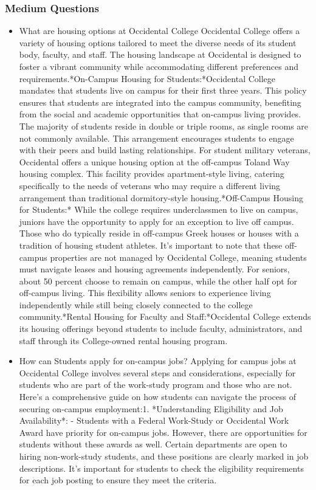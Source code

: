 \documentclass[10pt,twocolumn]{article}
\begin{document}
\subsubsection{Medium Questions}
\begin{itemize}
\item What are housing options at Occidental College
Occidental College offers a variety of housing options tailored to meet the diverse needs of its student body, faculty, and staff. The housing landscape at Occidental is designed to foster a vibrant community while accommodating different preferences and requirements.*On-Campus Housing for Students:*Occidental College mandates that students live on campus for their first three years. This policy ensures that students are integrated into the campus community, benefiting from the social and academic opportunities that on-campus living provides. The majority of students reside in double or triple rooms, as single rooms are not commonly available. This arrangement encourages students to engage with their peers and build lasting relationships.
For student military veterans, Occidental offers a unique housing option at the off-campus Toland Way housing complex. This facility provides apartment-style living, catering specifically to the needs of veterans who may require a different living arrangement than traditional dormitory-style housing.*Off-Campus Housing for Students:*
While the college requires underclassmen to live on campus, juniors have the opportunity to apply for an exception to live off campus. Those who do typically reside in off-campus Greek houses or houses with a tradition of housing student athletes. It's important to note that these off-campus properties are not managed by Occidental College, meaning students must navigate leases and housing agreements independently.
For seniors, about 50 percent choose to remain on campus, while the other half opt for off-campus living. This flexibility allows seniors to experience living independently while still being closely connected to the college community.*Rental Housing for Faculty and Staff:*Occidental College extends its housing offerings beyond students to include faculty, administrators, and staff through its College-owned rental housing program.
\newline
\item How can Students apply for on-campus jobs?
Applying for campus jobs at Occidental College involves several steps and considerations, especially for students who are part of the work-study program and those who are not. Here’s a comprehensive guide on how students can navigate the process of securing on-campus employment:1. *Understanding Eligibility and Job Availability*: - Students with a Federal Work-Study or Occidental Work Award have priority for on-campus jobs. However, there are opportunities for students without these awards as well. Certain departments are open to hiring non-work-study students, and these positions are clearly marked in job descriptions. It’s important for students to check the eligibility requirements for each job posting to ensure they meet the criteria.

\end{itemize}
\end{document}

